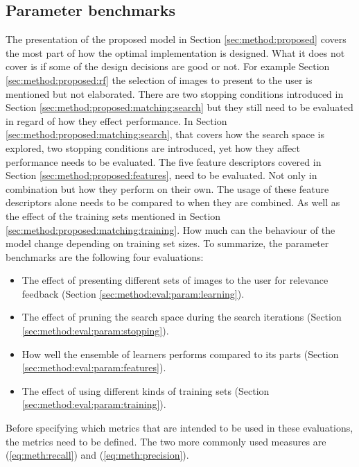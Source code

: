 \subsection{Parameter benchmarks}
\label{sec:method:eval:param}
The presentation of the proposed model in Section \ref{sec:method:proposed} covers the most part of how the optimal implementation is designed. What it does not cover is if some of the design decisions are good or not. For example Section \ref{sec:method:proposed:rf} the selection of images to present to the user is mentioned but not elaborated. There are two stopping conditions introduced in Section \ref{sec:method:proposed:matching:search} but they still need to be evaluated in regard of how they effect performance. In Section \ref{sec:method:proposed:matching:search}, that covers how the search space is explored, two stopping conditions are introduced, yet how they affect performance needs to be evaluated. The five feature descriptors covered in Section \ref{sec:method:proposed:features}, need to be evaluated. Not only in combination but how they perform on their own.
The usage of these feature descriptors alone needs to be compared to when they are combined. As well as the effect of the training sets mentioned in Section \ref{sec:method:proposed:matching:training}. How much can the behaviour of the model change depending on training set sizes.
To summarize, the parameter benchmarks are the following four evaluations:
\begin{itemize}
\item The effect of presenting different sets of images to the user for relevance feedback (Section \ref{sec:method:eval:param:learning}).
\item The effect of pruning the search space during the search iterations (Section \ref{sec:method:eval:param:stopping}).
\item How well the ensemble of learners performs compared to its parts (Section \ref{sec:method:eval:param:features}).
\item The effect of using different kinds of training sets (Section \ref{sec:method:eval:param:training}).
\end{itemize}
\medskip

Before specifying which metrics that are intended to be used in these evaluations, the metrics need to be defined. The two more commonly used measures are (\ref{eq:meth:recall}) and (\ref{eq:meth:precision}).

